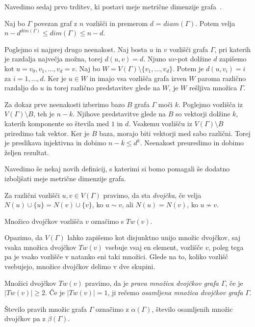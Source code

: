\documentclass[mat1, tisk]{fmfdelo}
\begin{document}
Navedimo sedaj prvo trditev, ki postavi meje metrične dimenzije grafa~\cite{10chartrand}.
%
\begin{trditev}
  Naj bo $\Gamma$ povezan graf z $n$ vozlišči in premerom $d$ = $diam(\Gamma)$. Potem velja
  $n - d^{dim(\Gamma)} \leq dim(\Gamma) \leq n - d$.
\end{trditev}
\begin{dokaz}
  Poglejmo si najprej drugo neenakost. Naj bosta $u$ in $v$ vozlišči grafa 
  $\Gamma$, pri katerih je razdalja največja možna, torej $d(u,v) = d$. 
  Njuno $uv$-pot dolžine $d$ zapišemo kot $u=v_0, v_1, \ldots, v_d=v$. 
  Naj bo $W = V(\Gamma) \setminus \{v_1, \ldots, v_d \}$. Potem je 
  $d(u,v_i) = i$ za $i = 1, \ldots, d$. Ker je $u \in W$ in imajo 
  vsa vozlišča grafa izven $W$ paroma različno razdaljo do $u$ in 
  torej različno predstavitev glede na $W$, je $W$ 
  rešljiva množica $\Gamma$.

  Za dokaz prve neenakosti izberimo bazo $B$ grafa $\Gamma$ moči $k$. 
  Poglejmo vozlišča iz $V(\Gamma) \setminus B$, teh je $n-k$. 
  Njihove predstavitve 
  glede na $B$ so vektorji dolžine $k$, katerih komponente so števila med 
  $1$ in $d$. Vsakemu vozlišču iz $V(\Gamma) \setminus B$ priredimo 
  tak vektor. Ker je $B$ baza, morajo biti vektorji med sabo različni. 
  Torej je preslikava injektivna in dobimo $n - k \leq d^k$. 
  Neenakost preuredimo in dobimo željen rezultat.
\end{dokaz}
%
Navedimo še nekaj novih definicij, s katerimi si bomo pomagali še dodatno 
izboljšati meje metrične dimenzije grafa.
%
\begin{definicija}
  Za različni vozlišči $u, v\in V(\Gamma)$ pravimo, da sta \emph{dvojčka}, če velja 
  $N(u) \cup \{u\} = N(v) \cup \{v\} $, ko $u \sim v$, ali 
  $N(u) = N(v) $, ko $u \nsim v$.

  Množico dvojčkov vozlišča $v$ označimo s $Tw(v)$.
\end{definicija}
%
Opazimo, da $V(\Gamma)$ lahko zapišemo kot disjunktno unijo množic 
dvojčkov, saj vsaka množica dvojčkov $Tw(v)$ vsebuje vsaj en element, vozlišče $v$, 
poleg tega pa je vsako vozlišče v natanko eni taki množici.
Glede na to, koliko vozlišč vsebujejo, množice dvojčkov delimo v dve skupini.
%
\begin{definicija}
  Množici dvojčkov $Tw(v)$ pravimo, da je \emph{prava množica dvojčkov grafa $\Gamma$}, 
  če je $|Tw(v)| \geq 2$. Če je $|Tw(v)| = 1$, ji rečemo 
  \emph{osamljena množica dvojčkov grafa $\Gamma$}. 

  Število pravih množic grafa $\Gamma$ označimo z \emph{$\alpha(\Gamma)$}, število 
  osamljenih množic dvojčkov pa z \emph{$\beta(\Gamma)$}.
\end{definicija}
\end{document}
